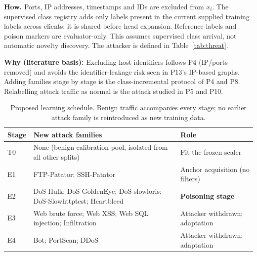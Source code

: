 \documentclass[10pt,a4paper]{article}
\newcommand{\why}[1]{\par\nopagebreak[4]\noindent\colorbox{black!5}{\parbox{\dimexpr\linewidth-2\fboxsep}{\small\textbf{Why (literature basis):} #1}}\par}
\begin{document}
\textbf{How.} Ports, IP addresses, timestamps and IDs are excluded from $x_i$. The supervised class registry adds only labels present in the current supplied training labels across clients; it is shared before head expansion. Reference labels and poison markers are evaluator-only. This assumes supervised class arrival, not automatic novelty discovery. The attacker is defined in Table~\ref{tab:threat}.

\why{Excluding host identifiers follows P4 (IP/ports removed) and avoids the identifier-leakage risk seen in P13's IP-based graphs. Adding families stage by stage is the class-incremental protocol of P4 and P8. Relabelling attack traffic as normal is the attack studied in P5 and P10.}

\begin{table}[H]
\centering\footnotesize
\caption{Proposed learning schedule. Benign traffic accompanies every stage; no earlier attack family is reintroduced as new training data.}
\label{tab:schedule}
\begin{tabularx}{\linewidth}{L{1.0cm}Y L{3.2cm}}
\toprule
Stage & New attack families & Role\\
\midrule
T0 & None (benign calibration pool, isolated from all other splits) & Fit the frozen scaler\\
E1 & FTP-Patator; SSH-Patator & Anchor acquisition (no filters)\\
E2 & DoS-Hulk; DoS-GoldenEye; DoS-slowloris; DoS-Slowhttptest; Heartbleed & \textbf{Poisoning stage}\\
E3 & Web brute force; Web XSS; Web SQL injection; Infiltration & Attacker withdrawn; adaptation\\
E4 & Bot; PortScan; DDoS & Attacker withdrawn; adaptation\\
\bottomrule
\end{tabularx}
\end{table}
\end{document}
